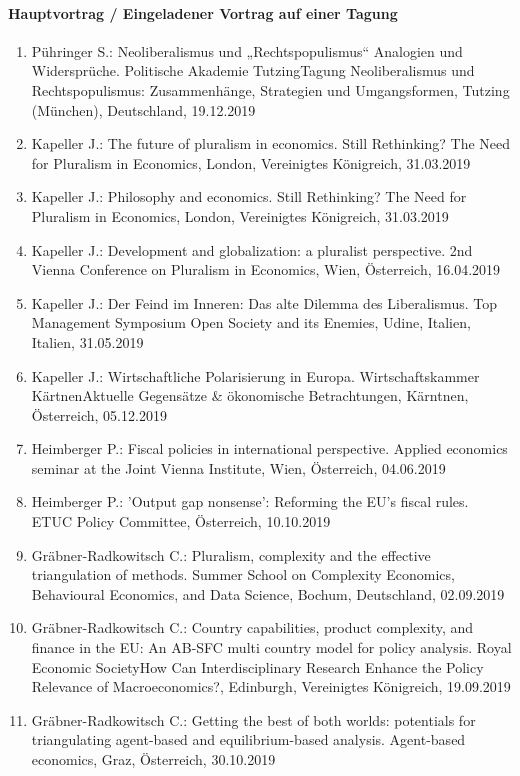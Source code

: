 \paragraph{Hauptvortrag / Eingeladener Vortrag auf einer Tagung}
\begin{enumerate}
	\item Pühringer S.: Neoliberalismus und „Rechtspopulismus“ Analogien und Widersprüche. Politische Akademie TutzingTagung Neoliberalismus und Rechtspopulismus: Zusammenhänge, Strategien und Umgangsformen, Tutzing (München), Deutschland, 19.12.2019
	\item Kapeller J.: The future of pluralism in economics. Still Rethinking? The Need for Pluralism in Economics, London, Vereinigtes Königreich, 31.03.2019
	\item Kapeller J.: Philosophy and economics. Still Rethinking? The Need for Pluralism in Economics, London, Vereinigtes Königreich, 31.03.2019
	\item Kapeller J.: Development and globalization: a pluralist perspective. 2nd Vienna Conference on Pluralism in Economics, Wien, Österreich, 16.04.2019
	\item Kapeller J.: Der Feind im Inneren: Das alte Dilemma des Liberalismus. Top Management Symposium \glqq Open Society and its Enemies\grqq{}, Udine, Italien, Italien, 31.05.2019
	\item Kapeller J.: Wirtschaftliche Polarisierung in Europa. Wirtschaftskammer KärtnenAktuelle Gegensätze \& ökonomische Betrachtungen, Kärntnen, Österreich, 05.12.2019
	\item Heimberger P.: Fiscal policies in international perspective. Applied economics seminar at the Joint Vienna Institute, Wien, Österreich, 04.06.2019
	\item Heimberger P.: 'Output gap nonsense': Reforming the EU's fiscal rules. ETUC Policy Committee, Österreich, 10.10.2019
	\item Gräbner-Radkowitsch C.: Pluralism, complexity and the effective triangulation of methods. Summer School on Complexity Economics, Behavioural Economics, and Data Science, Bochum, Deutschland, 02.09.2019
	\item Gräbner-Radkowitsch C.: Country capabilities, product complexity, and finance in the EU: An AB-SFC multi country model for policy analysis. Royal Economic SocietyHow Can Interdisciplinary Research Enhance the Policy Relevance of Macroeconomics?, Edinburgh, Vereinigtes Königreich, 19.09.2019
	\item Gräbner-Radkowitsch C.: Getting the best of both worlds: potentials for triangulating agent-based and equilibrium-based analysis. Agent-based economics, Graz, Österreich, 30.10.2019
\end{enumerate}
